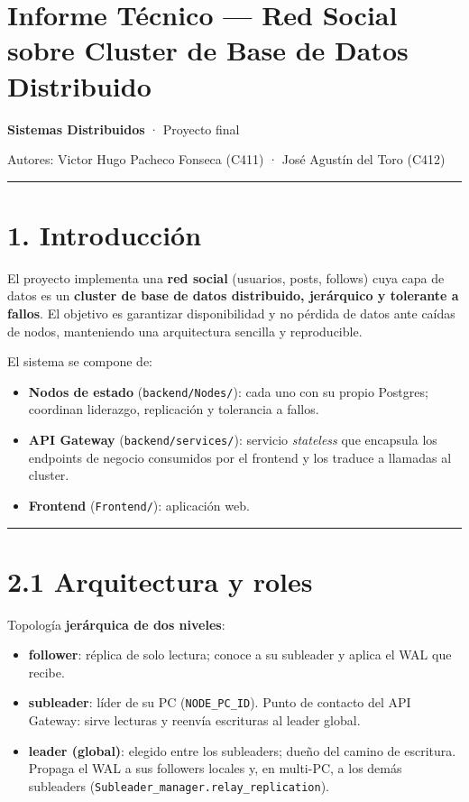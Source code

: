 \documentclass[11pt]{article}
\begin{document}
\section*{Informe Técnico — Red Social sobre Cluster de Base de Datos Distribuido}

\textbf{Sistemas Distribuidos} · Proyecto final

Autores: Victor Hugo Pacheco Fonseca (C411) · José Agustín del Toro (C412)

\vspace{2pt}\noindent\rule{\textwidth}{0.4pt}\vspace{2pt}

\section{1. Introducción}

El proyecto implementa una \textbf{red social} (usuarios, posts, follows) cuya capa de datos es un \textbf{cluster de base de datos distribuido, jerárquico y tolerante a fallos}. El objetivo es garantizar disponibilidad y no pérdida de datos ante caídas de nodos, manteniendo una arquitectura sencilla y reproducible.

El sistema se compone de:

\begin{itemize}
\item \textbf{Nodos de estado} (\texttt{backend/\allowbreak{}Nodes/\allowbreak{}}): cada uno con su propio Postgres; coordinan liderazgo, replicación y tolerancia a fallos.
\item \textbf{API Gateway} (\texttt{backend/\allowbreak{}services/\allowbreak{}}): servicio \emph{stateless} que encapsula los endpoints de negocio consumidos por el frontend y los traduce a llamadas al cluster.
\item \textbf{Frontend} (\texttt{Frontend/\allowbreak{}}): aplicación web.
\end{itemize}

\vspace{2pt}\noindent\rule{\textwidth}{0.4pt}\vspace{2pt}

\section{2.1 Arquitectura y roles}

Topología \textbf{jerárquica de dos niveles}:

\begin{itemize}
\item \textbf{follower}: réplica de solo lectura; conoce a su subleader y aplica el WAL que recibe.
\item \textbf{subleader}: líder de su PC (\texttt{NODE\_\allowbreak{}PC\_\allowbreak{}ID}). Punto de contacto del API Gateway: sirve lecturas y reenvía escrituras al leader global.
\item \textbf{leader (global)}: elegido entre los subleaders; dueño del camino de escritura. Propaga el WAL a sus followers locales y, en multi-PC, a los demás subleaders (\texttt{Subleader\_\allowbreak{}manager.\allowbreak{}relay\_\allowbreak{}replication}).
\end{itemize}
\end{document}
